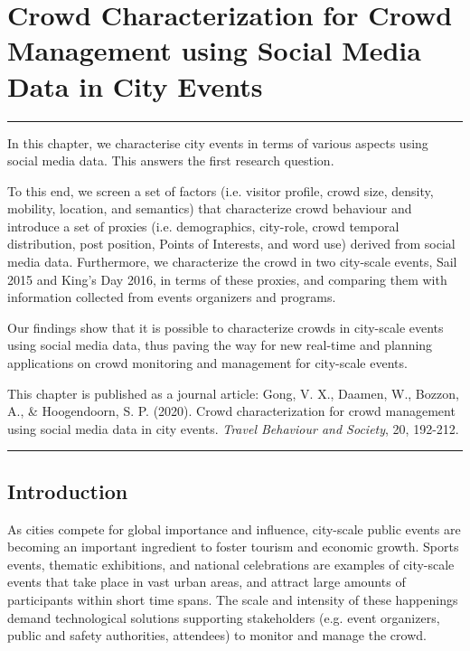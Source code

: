 \chapter{Crowd Characterization for Crowd Management using Social Media Data in City Events}\label{ch2_title}

\graphicspath{{./ch-2-charateristics/images/}}
\noindent\rule{\textwidth}{1pt}

In this chapter, we characterise city events in terms of various aspects using social media data. This answers the first research question. 

To this end, we screen a set of factors (i.e. visitor profile, crowd size, density, mobility, location, and semantics) that characterize crowd behaviour and introduce a set of proxies (i.e. demographics, city-role, crowd temporal distribution, post position, Points of Interests, and word use) derived from social media data. Furthermore, we characterize the crowd in two city-scale events, Sail 2015 and King's Day 2016, in terms of these proxies, and comparing them with information collected from events organizers and programs.

Our findings show that it is possible to characterize crowds in city-scale events using social media data, thus paving the way for new real-time and planning applications on crowd monitoring and management for city-scale events.

This chapter is published as a journal article: Gong, V. X., Daamen, W., Bozzon, A., \& Hoogendoorn, S. P. (2020). Crowd characterization for crowd management using social media data in city events. \emph{Travel Behaviour and Society}, 20, 192-212.

\noindent\rule{\textwidth}{1pt}

\newpage


\vspace*{-10mm}
\section{Introduction}\label{ch2_2.1_introduction}

As cities compete for global importance and influence, city-scale public events are becoming an important ingredient to foster tourism and economic growth. Sports events, thematic exhibitions, and national celebrations are examples of city-scale events that take place in vast urban areas, and attract large amounts of participants within short time spans. The scale and intensity of these happenings demand technological solutions supporting stakeholders (e.g. event organizers, public and safety authorities, attendees) to monitor and manage the crowd.
